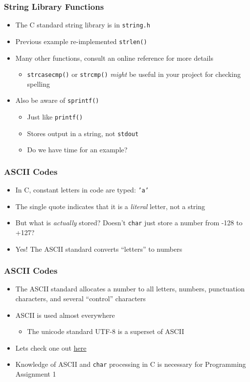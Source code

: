 \documentclass[14pt]{beamer}
\begin{document}
\begin{frame}
\frametitle{String Library Functions}
\begin{itemize}
\item The C standard string library is in \texttt{string.h}
\item Previous example re-implemented \texttt{strlen()}
\item Many other functions, consult an online reference for more details
	\begin{itemize}
		\item \texttt{strcasecmp()} or \texttt{strcmp()} \textit{might} be useful in your project for checking spelling
	\end{itemize}
\item Also be aware of \texttt{sprintf()}
	\begin{itemize}
		\item Just like \texttt{printf()}
		\item Stores output in a string, not \texttt{stdout}
		\item Do we have time for an example?
	\end{itemize}
\end{itemize}
\end{frame}

\begin{frame}
\frametitle{ASCII Codes}
\begin{itemize}
\item In C, constant letters in code are typed: \texttt{'a'}
\item The single quote indicates that it is a \textit{literal} letter, not a string
\pause
\item But what is \textit{actually} stored? Doesn't \texttt{char} just store a number from -128 to +127?
\pause
\item Yes! The ASCII standard converts ``letters'' to numbers
\end{itemize}
\end{frame}

\begin{frame}
\frametitle{ASCII Codes}
\begin{itemize}
\item The ASCII standard allocates a number to all letters, numbers, punctuation characters, and several ``control'' characters
\item ASCII is used almost everywhere
	\begin{itemize}
		\item The unicode standard UTF-8 is a superset of ASCII
	\end{itemize}
\item Lets check one out \underline{\href{http://asciichart.com/}{here}}
\item Knowledge of ASCII and \texttt{char} processing in C is necessary for Programming Assignment 1
\end{itemize}
\end{frame}
\end{document}
